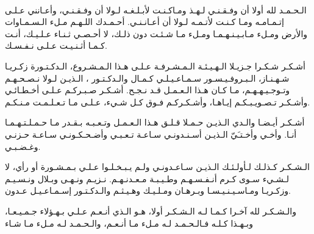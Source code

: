 \ \vfill{}
\begin{center}
    {
        \Large\bfseries
    }
\end{center}

\begin{RLtext}
    الـحـمـد لله أولا أن وفـقـنـي لـهـذ ومـاكـنـت لأبـلـغـه لـولا أن وفـقـنـي،
    وأعـانني عـلـى إتـمـامـه ومـا كـنـت لأتـمـه لـولا أن أعـانـنـي.
    أحـمـدك اللـهـم مـلء الـسـمـاوات والأرض ومـلء مـابـيـنـهـمـا ومـلء مـا شـئـت دون ذلـك،
    لا أحـصـي ثـنـاء عـلـيـك، أنـت كـمـا أثـنـيـت عـلـى نـفـسـك.
    
    أشـكـر شـكـرا جـزيـلا الـهـيـئـة الـمـشـرفـة عـلـى هـذا الـمـشـروع،
    الـدكـتـورة زكـريـا شـهـنـاز، الـبـروفـيـسـور سـمـاعـيـلـي كـمـال والـدكـتـور ،
    الـذيـن لـولا نـصـحـهـم وتـوجـيـهـهـم، مـا كـان هـذا الـعـمـل قـد نـجـح.
    أشـكـر صـبـركـم عـلـى أخـطـائـي وأشـكـر تـصـويـبـكـم إيـاهـا،
    وأشـكـركـم فـوق كـل شـيء، عـلـى مـا تـعـلـمـت مـنـكـم.
    
    أشـكـر أيـضـا والـدي الـذيـن حـمـلا قـلـق هـذا الـعـمـل وتـعـبـه بـقـدر مـا حـمـلـتـهـمـا أنـا.
    وأخـي وأخـتـَيّ الـذيـن أسـنـدونـي سـاعـة تـعـبـي وأضـحـكـونـي سـاعـة حـزنـي وغـضـبـي.
    
    الـشـكـر كـذلـك لـأولـئـك الـذيـن سـاعـدونـي ولـم يـبـخـلـوا عـلـي بـمـشـورة أو رأي، 
    لا لـشـيء سـوى كـرم أنـفـسـهـم وطـيـبـة مـعـدنـهـم.
    نـزيـم ونـهـى وبـلال ونـسـيـم وزكـريـا ومـاسـيـنـيـسـا وبـرهـان ومـلـيـك وهـيـثـم والـدكـتـور إسـمـاعـيـل عـدون.
    
    والـشـكـر لله آخـرا كـمـا لـه الـشـكـر أولا، 
    هـو الـذي أنـعـم عـلـي بـهـؤلاء جـمـيـعـا، وبـهـذا كـلـه
    فـالـحـمـد لـه مـلء مـا أنـعـم، والـحـمـد لـه مـلء مـا شـاء
\end{RLtext}
\vfill{}